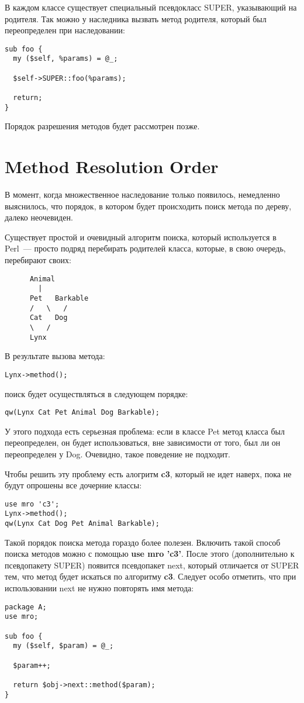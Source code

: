 В каждом классе существует специальный псевдокласс SUPER, указывающий на родителя. Так можно у наследника вызвать метод родителя, который был переопределен при наследовании:
\begin{verbatim}
sub foo {
  my ($self, %params) = @_;

  $self->SUPER::foo(%params);

  return;
}
\end{verbatim}
Порядок разрешения методов будет рассмотрен позже.

\section{Method Resolution Order}%
В момент, когда множественное наследование только появилось, немедленно выяснилось, что порядок, в котором будет происходить поиск метода по дереву, далеко неочевиден.

Существует простой и очевидный алгоритм поиска, который используется в Perl~--- просто подряд перебирать родителей класса, которые, в свою очередь, перебирают своих:
\begin{verbatim}
      Animal
        |
      Pet   Barkable
      /   \   /
      Cat   Dog
      \   /
      Lynx
\end{verbatim}
В результате вызова метода:
\begin{verbatim}
Lynx->method();
\end{verbatim}
поиск будет осуществляться в следующем порядке:
\begin{verbatim}
qw(Lynx Cat Pet Animal Dog Barkable);
\end{verbatim}
У этого подхода есть серьезная проблема: если в классе Pet метод класса был переопределен, он будет использоваться, вне зависимости от того, был ли он переопределен у Dog. Очевидно, такое поведение не подходит.

Чтобы решить эту проблему есть алогритм \textbf{c3}, который не идет наверх, пока не будут опрошены все дочерние классы:
\begin{verbatim}
use mro 'c3';
Lynx->method();
qw(Lynx Cat Dog Pet Animal Barkable);
\end{verbatim}
Такой порядок поиска метода гораздо более полезен. Включить такой способ поиска методов можно с помощью  \textbf{use mro 'c3'}. После этого (дополнительно к псевдопакету SUPER) появится псевдопакет next, который отличается от SUPER тем, что метод будет искаться по алгоритму \textbf{c3}. Следует особо отметить, что при использовании next не нужно повторять имя метода:
\begin{verbatim}
package A;
use mro;

sub foo {
  my ($self, $param) = @_;

  $param++;

  return $obj->next::method($param);
}
\end{verbatim}

